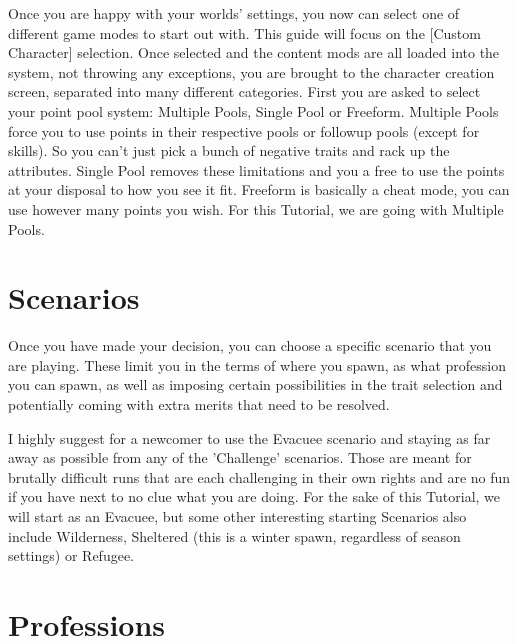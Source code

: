 \documentclass[11pt]{report}
\begin{document}
Once you are happy with your worlds' settings, you now can select one of different game modes to start out with. This guide will focus on the [Custom Character] selection. Once selected and the content mods are all loaded into the system, not throwing any exceptions, you are brought to the character creation screen, separated into many different categories. First you are asked to select your point pool system: Multiple Pools, Single Pool or Freeform. Multiple Pools force you to use points in their respective pools or followup pools (except for skills). So you can't just pick a bunch of negative traits and rack up the attributes. Single Pool removes these limitations and you a free to use the points at your disposal to how you see it fit. Freeform is basically a cheat mode, you can use however many points you wish. For this Tutorial, we are going with Multiple Pools.

\section{Scenarios}

Once you have made your decision, you can choose a specific scenario that you are playing. These limit you in the terms of where you spawn, as what profession you can spawn, as well as imposing certain possibilities in the trait selection and potentially coming with extra merits that need to be resolved.

I highly suggest for a newcomer to use the Evacuee scenario and staying as far away as possible from any of the 'Challenge' scenarios. Those are meant for brutally difficult runs that are each challenging in their own rights and are no fun if you have next to no clue what you are doing. For the sake of this Tutorial, we will start as an Evacuee, but some other interesting starting Scenarios also include Wilderness, Sheltered (this is a winter spawn, regardless of season settings) or Refugee.

\section{Professions}
\end{document}

